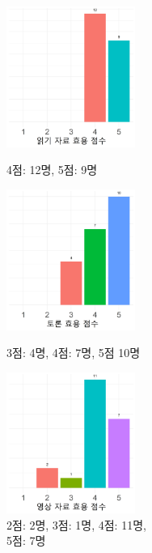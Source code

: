 \documentclass[10pt, a4paper, chapter]{oblivoir}
\begin{document}
\begin{figure}
    \captionsetup{justification=centering} %

    \begin{minipage}{0.45\linewidth}        
        \centering
        \includegraphics[height = 4.6cm, width = 0.75\linewidth]{reading.png}
        \caption{4점: 12명, 5점: 9명}
        \label{reading}
    \end{minipage}
    \hspace{0.05\linewidth}
    \begin{minipage}{0.45\linewidth}        
        \centering
        \includegraphics[height = 4.6cm, width = 0.75\linewidth]{debate.png}
        \caption{3점: 4명, 4점: 7명, 5점 10명}
        \label{debate}
    \end{minipage}
    \newline
    \begin{minipage}{0.45\linewidth}        
        \centering
        \includegraphics[height = 4.6cm, width = 0.75\linewidth]{video.png}
        \caption{2점: 2명, 3점: 1명, 4점: 11명,\\5점: 7명}
        \label{video}

\end{minipage}
\end{figure}
\end{document}
